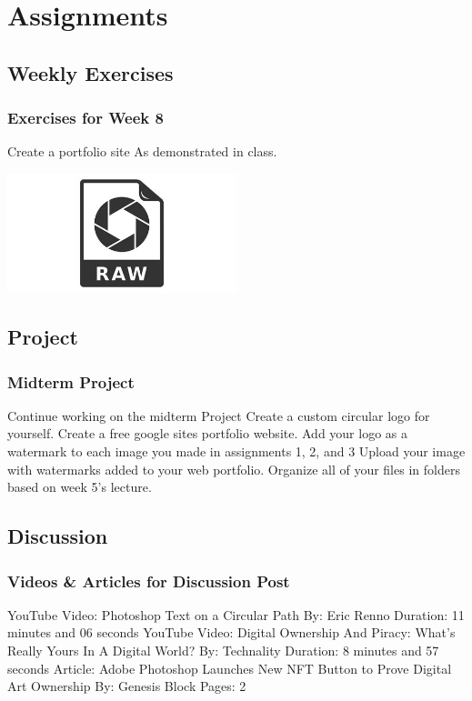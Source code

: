 \documentclass{beamer}
\begin{document}
		\section{Assignments}
			\subsection{Weekly Exercises}		
			\begin{frame}
				\frametitle{Exercises for Week 8}
				\begin{outline}
					\1 Create a portfolio site
					\1 As demonstrated in class.
				\end{outline}
				\includegraphics[width=0.5\textwidth]{images/raw.jpg}
			\end{frame}
		
		\subsection{Project}		
			\begin{frame}
				\frametitle{Midterm Project}
				\begin{outline}
					\1 Continue working on the midterm Project
					\1 Create a custom circular logo for yourself.
					\1 Create a free google sites portfolio website.  
					\1 Add your logo as a watermark to each image you made in assignments 1,  2, and 3
					\1 Upload your image with watermarks added to your web portfolio.  
					\1 Organize all of your files in folders based on week 5's lecture.
				\end{outline}
			\end{frame}
	
			\subsection{Discussion}		
				\begin{frame}
					\frametitle{Videos \& Articles for Discussion Post}
					\begin{outline}
						\1 YouTube Video:  Photoshop Text on a Circular Path
							\2 By:          Eric Renno
							\2 Duration:     11 minutes and 06 seconds
						\1 YouTube Video:  Digital Ownership And Piracy: What's Really Yours In A Digital World?
							\2 By:          Technality
							\2 Duration:  8 minutes and 57 seconds
						\1 Article:  Adobe Photoshop Launches New NFT Button to Prove Digital Art Ownership
							\2 By:  Genesis Block
							\2 Pages:  2
					\end{outline}
					
				\end{frame}
\end{document}
